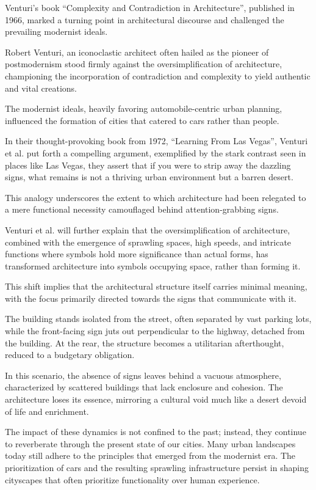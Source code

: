 Venturi's book ``Complexity and Contradiction in Architecture'', published in 1966, marked a turning point in architectural discourse and challenged the prevailing modernist ideals.

Robert Venturi, an iconoclastic architect often hailed as the pioneer of postmodernism\cite{Schudel2018} stood firmly against the oversimplification of architecture, championing the incorporation of contradiction and complexity to yield authentic and vital creations.

The modernist ideals, heavily favoring automobile-centric urban planning, influenced the formation of cities that catered to cars rather than people.

In their thought-provoking book from 1972, ``Learning From Las Vegas'', Venturi et al.\cite{Venturi1972} put forth a compelling argument, exemplified by the stark contrast seen in places like Las Vegas, they assert that if you were to strip away the dazzling signs, what remains is not a thriving urban environment but a barren desert.

This analogy underscores the extent to which architecture had been relegated to a mere functional necessity camouflaged behind attention-grabbing signs.

Venturi et al.\cite{Venturi1972} will further explain that the oversimplification of architecture, combined with the emergence of sprawling spaces, high speeds, and intricate functions where symbols hold more significance than actual forms, has transformed architecture into symbols occupying space, rather than forming it.

This shift implies that the architectural structure itself carries minimal meaning, with the focus primarily directed towards the signs that communicate with it.

The building stands isolated from the street, often separated by vast parking lots, while the front-facing sign juts out perpendicular to the highway, detached from the building.
At the rear, the structure becomes a utilitarian afterthought, reduced to a budgetary obligation\cite{Venturi1972}.

In this scenario, the absence of signs leaves behind a vacuous atmosphere, characterized by scattered buildings that lack enclosure and cohesion.
The architecture loses its essence, mirroring a cultural void much like a desert devoid of life and enrichment.

The impact of these dynamics is not confined to the past;
instead, they continue to reverberate through the present state of our cities.
Many urban landscapes today still adhere to the principles that emerged from the modernist era.
The prioritization of cars and the resulting sprawling infrastructure persist in shaping cityscapes that often prioritize functionality over human experience.


